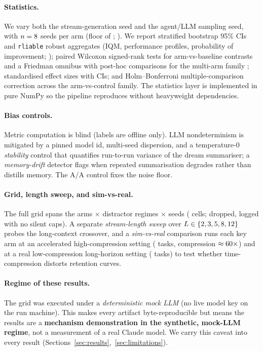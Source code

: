 \paragraph{Statistics.} We vary both the stream-generation seed and the
agent/LLM sampling seed, with $n=8$ seeds per arm (floor of
\SWpowerFloor; \citealp{colas2018seeds}). We report stratified bootstrap 95\%
CIs and \texttt{rliable} robust aggregates (IQM, performance profiles,
probability of improvement; \citealp{agarwal2021rliable}); paired Wilcoxon
signed-rank tests for arm-vs-baseline contrasts and a Friedman omnibus with
post-hoc comparisons for the multi-arm family \citep{demsar2006statistical};
standardised effect sizes with CIs; and Holm--Bonferroni multiple-comparison
correction across the arm-vs-control family. The statistics layer is implemented
in pure NumPy so the pipeline reproduces without heavyweight dependencies.

\paragraph{Bias controls.} Metric computation is blind (labels are offline
only). LLM nondeterminism is mitigated by a pinned model id, multi-seed
dispersion, and a temperature-0 \emph{stability} control that quantifies
run-to-run variance of the dream summariser; a \emph{memory-drift} detector
flags when repeated summarisation degrades rather than distills memory. The A/A
control fixes the noise floor.

\paragraph{Grid, length sweep, and sim-vs-real.} The full grid spans the
\SWnArms{} arms $\times$ \SWnRegimes{} distractor regimes $\times$ \SWnSeeds{}
seeds (\SWnCells{} cells; \SWnDropped{} dropped, logged with no silent caps). A
separate \emph{stream-length sweep} over $L\in\{2, 3, 5, 8, 12\}$ probes the
long-context crossover, and a \emph{sim-vs-real} comparison runs each key arm at
an accelerated high-compression setting (\SWsimNtasksSim{} tasks, compression
$\approx60\times$) and at a real low-compression long-horizon
setting (\SWsimNtasksReal{} tasks) to test whether time-compression distorts
retention curves.

\paragraph{Regime of these results.} The grid was executed under a
\emph{deterministic mock LLM} (no live model key on the run machine). This makes
every artifact byte-reproducible but means the results are a \textbf{mechanism
demonstration in the synthetic, mock-LLM regime}, not a measurement of a real
Claude model. We carry this caveat into every result
(Sections~\ref{sec:results},~\ref{sec:limitations}).
